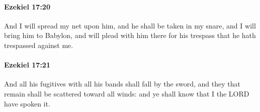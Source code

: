 		\paragraph{Ezekiel 17:20} %
			\label{EZEKIEL-17-20}

			And I will spread my net upon him, and he shall be taken in my snare, and I will bring him to Babylon, and will plead with him there for his trespass that he hath trespassed against me.


		\paragraph{Ezekiel 17:21} %
			\label{EZEKIEL-17-21}

			And all his fugitives with all his bands shall fall by the sword, and they that remain shall be scattered toward all winds: and ye shall know that I the LORD have spoken it.



